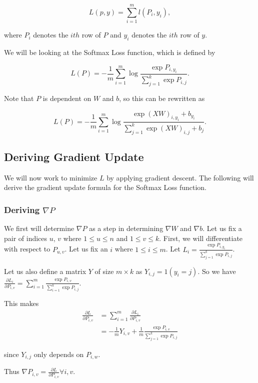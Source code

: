 \[
L(p, y) = \sum_{i=1}^m l(P_i, y_i),
\]

where $P_i$ denotes the $ith$ row of $P$ and $y_i$ denotes the $ith$ row of
$y$.

We will be looking at the Softmax Loss function, which is defined by

\[
L(P) = -\frac{1}{m} \sum_{i=1}^m \log \frac{\exp{P_{i, y_i}}}
                                           {\sum_{j=1}^k \exp{P_{i, j}}}.
\]

Note that $P$ is dependent on $W$ and $b$, so this can be rewritten as

\[
L(P) = -\frac{1}{m} \sum_{i=1}^m \log
        \frac{\exp{\left(XW\right)_{i, y_i} + b_{y_i}}}
             {\sum_{j=1}^k \exp{\left(XW\right)_{i, j} + b_j}}.
\]

\subsection{Deriving Gradient Update}
We will now work to minimize $L$ by applying gradient descent. The following
will derive the gradient update formula for the Softmax Loss function.

\subsubsection{Deriving $\nabla P$}
We first will determine $\nabla P$ as a step in determining $\nabla W$ and
$\nabla b$. Let us fix a pair of indices $u$, $v$ where $1 \leq u \leq n$ and
$1 \leq v \leq k$. First, we will differentiate with respect to $P_{u, v}$.
Let us fix an $i$ where $1 \leq i \leq m$.  Let $L_i = \frac{\exp{P_{i,
y_i}}}{\sum_{j=1}^k \exp{P_{i, j}}}$.


Let us also define a matrix $Y$ of size $m \times k$ as $Y_{i, j} = 1(y_i =
j)$. So we have $\frac{\partial L_i}{\partial P_{i,v}} = \sum_{i=1}^m
\frac{\exp{P_{i,v}}}{\sum_{i=1}^k \exp{P_{i,j}}}$.

This makes
\begin{align*}
  \frac{\partial L}{\partial P_{i,v}}
  &= \sum_{i=1}^m \frac{\partial L_i}{\partial P_{i,v}}\\
  &= -\frac{1}{m} Y_{i,v} + \frac{1}{m}
  \frac{\exp{P_{i,v}}}{\sum_{j=1}^k \exp{P_{i,j}}}
\end{align*}
  
since $Y_{i,j}$ only depends on $P_{i,w}$.

Thus $\nabla P_{i,v} = \frac{\partial L}{\partial P_{i,v}} \forall i,v.$

